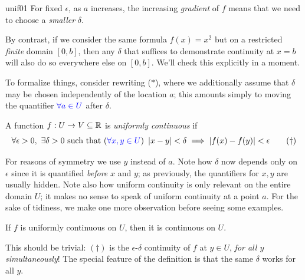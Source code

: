 \begin{example}{}{unif01}
	For fixed $\epsilon$, as $a$ increases, the increasing \emph{gradient} of $f$ means that we need to choose a \emph{smaller} $\delta$.\medbreak
	
	By contrast, if we consider the same formula $f(x)=x^2$ but on a restricted \emph{finite} domain $[0,b]$, then any $\delta$ that suffices to demonstrate continuity at $x=b$ will also do so everywhere else on $[0,b]$. We'll check this explicitly in a moment.
\end{example}


To formalize things, consider rewriting ($\ast$), where we additionally assume that $\delta$ may be chosen independently of the location $a$; this amounts simply to moving the quantifier $\textcolor{blue}{\forall a\in U}$ after $\delta$.

\begin{defn}{}{}
	A function $f:U\to V\subseteq \mathbb{R}$ is \emph{uniformly continuous} if
	\[
		\forall\epsilon>0,\ \exists\delta>0\text{ such that }(\textcolor{blue}{\forall x,y\in U})\ \nm{x-y}<\delta\implies\nm{f(x)-f(y)}<\epsilon \tag{$\dag$}
	\]
\end{defn}

For reasons of symmetry we use $y$ instead of $a$. Note how $\delta$ now depends only on $\epsilon$ since it is quantified \emph{before} $x$ and $y$; as previously, the quantifiers for $x,y$ are usually hidden. Note also how uniform continuity is only relevant on the entire domain $U$; it makes no sense to speak of uniform continuity at a point $a$.
\smallbreak
For the sake of tidiness, we make one more observation before seeing some examples.

\begin{lemm}{}{}
	If $f$ is uniformly continuous on $U$, then it is continuous on $U$.
\end{lemm}

This should be trivial: $(\dag)$ is the $\epsilon$-$\delta$ continuity of $f$ at $y\in U$, \emph{for all $y$ simultaneously}! The special feature of the definition is that the same $\delta$ works for all $y$.

\goodbreak


